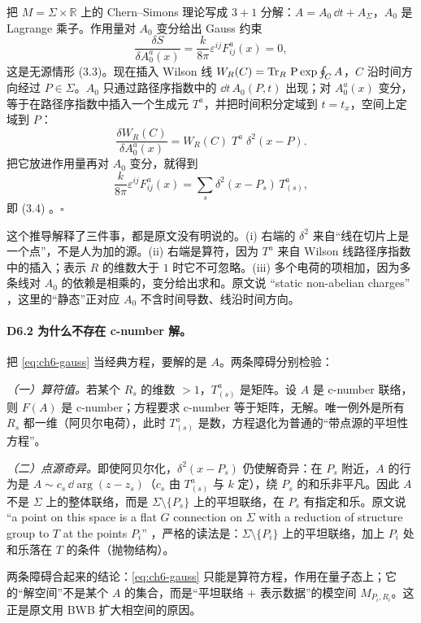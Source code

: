 \begin{derivation}
把 $M=\Sigma\times\mathbb R$ 上的 Chern--Simons 理论写成 $3+1$ 分解：$A=A_0\,\dd t+A_\Sigma$，$A_0$ 是 Lagrange 乘子。作用量对 $A_0$ 变分给出 Gauss 约束
\[
\frac{\delta S}{\delta A_0^a(x)}
=\frac{k}{8\pi}\varepsilon^{ij}F^a_{ij}(x)=0 ,
\]
这是无源情形 (3.3)。现在插入 Wilson 线 $W_R(C)=\operatorname{Tr}_R\,\mathrm P\exp\oint_C A$，$C$ 沿时间方向经过 $P\in\Sigma$。$A_0$ 只通过路径序指数中的 $\dd t\,A_0(P,t)$ 出现；对 $A_0^a(x)$ 变分，等于在路径序指数中插入一个生成元 $T^a$，并把时间积分定域到 $t=t_x$，空间上定域到 $P$：
\[
\frac{\delta W_R(C)}{\delta A_0^a(x)}
=W_R(C)\;T^a\;\delta^2(x-P).
\]
把它放进作用量再对 $A_0$ 变分，就得到
\[
\frac{k}{8\pi}\varepsilon^{ij}F^a_{ij}(x)
=\sum_s\delta^2(x-P_s)\,T^a_{(s)},
\]
即 (3.4) 。$\square$
\end{derivation}

这个推导解释了三件事，都是原文没有明说的。(i) 右端的 $\delta^2$ 来自“线在切片上是一个点”，不是人为加的源。(ii) 右端是算符，因为 $T^a$ 来自 Wilson 线路径序指数中的插入；表示 $R$ 的维数大于 $1$ 时它不可忽略。(iii) 多个电荷的项相加，因为多条线对 $A_0$ 的依赖是相乘的，变分给出求和。原文说 “static non-abelian charges” ，这里的“静态”正对应 $A_0$ 不含时间导数、线沿时间方向。

\paragraph{D6.2 为什么不存在 c-number 解。}把 \eqref{eq:ch6-gauss} 当经典方程，要解的是 $A$。两条障碍分别检验：

\emph{（一）算符值。}若某个 $R_s$ 的维数 $>1$，$T^a_{(s)}$ 是矩阵。设 $A$ 是 c-number 联络，则 $F(A)$ 是 c-number；方程要求 c-number 等于矩阵，无解。唯一例外是所有 $R_s$ 都一维（阿贝尔电荷），此时 $T^a_{(s)}$ 是数，方程退化为普通的“带点源的平坦性方程”。

\emph{（二）点源奇异。}即使阿贝尔化，$\delta^2(x-P_s)$ 仍使解奇异：在 $P_s$ 附近，$A$ 的行为是 $A\sim c_s\,\dd\arg(z-z_s)$（$c_s$ 由 $T^a_{(s)}$ 与 $k$ 定），绕 $P_s$ 的和乐非平凡。因此 $A$ 不是 $\Sigma$ 上的整体联络，而是 $\Sigma\setminus\{P_s\}$ 上的平坦联络，在 $P_s$ 有指定和乐。原文说 “a point on this space is a flat $G$ connection on $\Sigma$ with a reduction of structure group to $T$ at the points $P_i$” ，严格的读法是：$\Sigma\setminus\{P_i\}$ 上的平坦联络，加上 $P_i$ 处和乐落在 $T$ 的条件（抛物结构）。

两条障碍合起来的结论：\eqref{eq:ch6-gauss} 只能是算符方程，作用在量子态上；它的“解空间”不是某个 $A$ 的集合，而是“平坦联络 + 表示数据”的模空间 $M_{P_i,R_i}$。这正是原文用 BWB 扩大相空间的原因。

